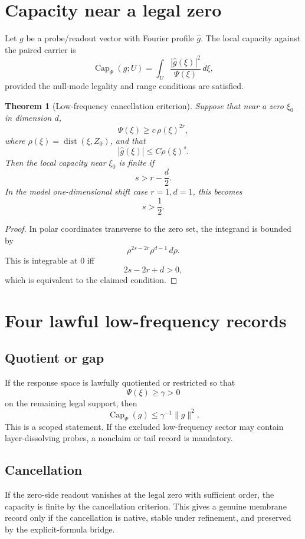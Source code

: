 \documentclass[11pt]{article}
\newtheorem{theorem}{Theorem}
\newcommand{\Cap}{\operatorname{Cap}}
\begin{document}
\section{Capacity near a legal zero}
Let $g$ be a probe/readout vector with Fourier profile $\widehat g$. The local capacity against the paired carrier is
\[
  \Cap_\Psi(g;U)=\int_U \frac{|\widehat g(\xi)|^2}{\Psi(\xi)}\,d\xi,
\]
provided the null-mode legality and range conditions are satisfied.

\begin{theorem}[Low-frequency cancellation criterion]
Suppose that near a zero $\xi_0$ in dimension $d$,
\[
  \Psi(\xi)\ge c\,\rho(\xi)^{2r},
\]
where $\rho(\xi)=\operatorname{dist}(\xi,Z_0)$, and that
\[
  |\widehat g(\xi)|\le C\rho(\xi)^s.
\]
Then the local capacity near $\xi_0$ is finite if
\[
  s>r-\frac d2.
\]
In the model one-dimensional shift case $r=1,d=1$, this becomes
\[
  s>\frac12.
\]
\end{theorem}

\begin{proof}
In polar coordinates transverse to the zero set, the integrand is bounded by
\[
  \rho^{2s-2r}\rho^{d-1}\,d\rho.
\]
This is integrable at $0$ iff
\[
  2s-2r+d>0,
\]
which is equivalent to the claimed condition.
\end{proof}

\section{Four lawful low-frequency records}
\subsection{Quotient or gap}
If the response space is lawfully quotiented or restricted so that
\[
  \Psi(\xi)\ge \gamma>0
\]
on the remaining legal support, then
\[
  \Cap_\Psi(g)\le \gamma^{-1}\|g\|^2.
\]
This is a scoped statement. If the excluded low-frequency sector may contain layer-dissolving probes, a nonclaim or tail record is mandatory.

\subsection{Cancellation}
If the zero-side readout vanishes at the legal zero with sufficient order, the capacity is finite by the cancellation criterion. This gives a genuine membrane record only if the cancellation is native, stable under refinement, and preserved by the explicit-formula bridge.
\end{document}
